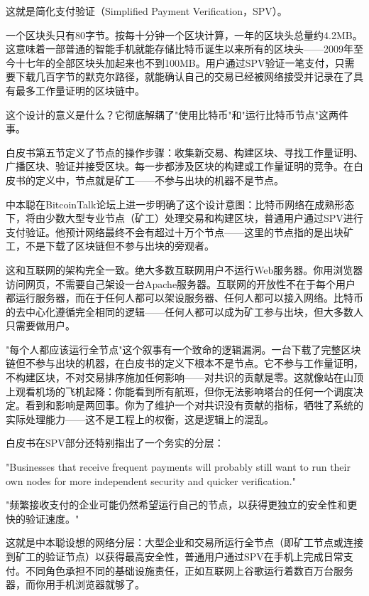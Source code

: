 \documentclass[a4paper,12pt,openany]{ctexbook}
\newenvironment{quoting}{%
  \par\vspace{0.5em}%
  \begin{list}{}{%
    \setlength{\leftmargin}{2em}%
    \setlength{\rightmargin}{2em}%
    \setlength{\parsep}{0.3em}%
    \setlength{\itemsep}{0pt}%
    \setlength{\topsep}{0pt}%
  }%
  \item\relax
}{%
  \end{list}%
  \par\vspace{0.5em}%
}
\begin{document}
这就是简化支付验证（Simplified Payment Verification，SPV）。

一个区块头只有80字节。按每十分钟一个区块计算，一年的区块头总量约4.2MB。这意味着一部普通的智能手机就能存储比特币诞生以来所有的区块头——2009年至今十七年的全部区块头加起来也不到100MB。用户通过SPV验证一笔支付，只需要下载几百字节的默克尔路径，就能确认自己的交易已经被网络接受并记录在了具有最多工作量证明的区块链中。

这个设计的意义是什么？它彻底解耦了"使用比特币"和"运行比特币节点"这两件事。

白皮书第五节定义了节点的操作步骤：收集新交易、构建区块、寻找工作量证明、广播区块、验证并接受区块。每一步都涉及区块的构建或工作量证明的竞争。在白皮书的定义中，节点就是矿工——不参与出块的机器不是节点。

中本聪在BitcoinTalk论坛上进一步明确了这个设计意图：比特币网络在成熟形态下，将由少数大型专业节点（矿工）处理交易和构建区块，普通用户通过SPV进行支付验证。他预计网络最终不会有超过十万个节点——这里的节点指的是出块矿工，不是下载了区块链但不参与出块的旁观者。

这和互联网的架构完全一致。绝大多数互联网用户不运行Web服务器。你用浏览器访问网页，不需要自己架设一台Apache服务器。互联网的开放性不在于每个用户都运行服务器，而在于任何人都可以架设服务器、任何人都可以接入网络。比特币的去中心化遵循完全相同的逻辑——任何人都可以成为矿工参与出块，但大多数人只需要做用户。

"每个人都应该运行全节点"这个叙事有一个致命的逻辑漏洞。一台下载了完整区块链但不参与出块的机器，在白皮书的定义下根本不是节点。它不参与工作量证明，不构建区块，不对交易排序施加任何影响——对共识的贡献是零。这就像站在山顶上观看机场的飞机起降：你能看到所有航班，但你无法影响塔台的任何一个调度决定。看到和影响是两回事。你为了维护一个对共识没有贡献的指标，牺牲了系统的实际处理能力——这不是工程上的权衡，这是逻辑上的混乱。

白皮书在SPV部分还特别指出了一个务实的分层：


\begin{quoting}
\small
"Businesses that receive frequent payments will probably still want to run their own nodes for more independent security and quicker verification."

"频繁接收支付的企业可能仍然希望运行自己的节点，以获得更独立的安全性和更快的验证速度。"
\end{quoting}


这就是中本聪设想的网络分层：大型企业和交易所运行全节点（即矿工节点或连接到矿工的验证节点）以获得最高安全性，普通用户通过SPV在手机上完成日常支付。不同角色承担不同的基础设施责任，正如互联网上谷歌运行着数百万台服务器，而你用手机浏览器就够了。
\end{document}
